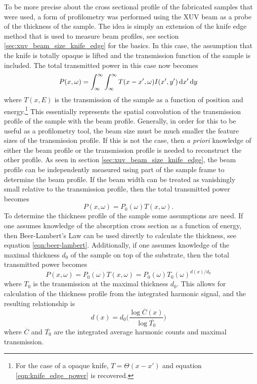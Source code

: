 To be more precise about the cross sectional profile of the fabricated samples that were used, a form of profilometry was performed using the XUV beam as a probe of the thickness of the sample.  The idea is simply an extension of the knife edge method that is used to measure beam profiles, see section \ref{sec:xuv_beam_size_knife_edge} for the basics.  In this case, the assumption that the knife is totally opaque is lifted and the transmission function of the sample is included.  The total transmitted power in this case now becomes
\begin{equation}
	\label{eqn:transmission_knife_edge_power}
	P(x, \omega) = \int_{\infty}^{\infty}\int_{\infty}^{\infty} T(x - x', \omega) I(x', y')\mathop{}\!\mathrm{d} x' \mathop{}\!\mathrm{d} y
\end{equation}
where $T(x, E)$ is the transmission of the sample as a function of position and energy.\footnote{For the case of a opaque knife, $T = \Theta(x - x')$ and equation \ref{eqn:knife_edge_power} is recovered.} This essentially represents the spatial convolution of the transmission profile of the sample with the beam profile.  Generally, in order for this to be useful as a profilometry tool, the beam size must be much smaller the feature sizes of the transmission profile.  If this is not the case, then \emph{a priori} knowledge of either the beam profile or the transmission profile is needed to reconstruct the other profile.  As seen in section \ref{sec:xuv_beam_size_knife_edge}, the beam profile can be independently measured using part of the sample frame to determine the beam profile.  If the beam width can be treated as vanishingly small relative to the transmission profile, then the total transmitted power becomes
\begin{equation}
	\label{eqn:knife_edge_delta}
	P(x,\omega) = P_0(\omega)T(x,\omega).
\end{equation}
To determine the thickness profile of the sample some assumptions are need.  If one assumes knowledge of the absorption cross section as a function of energy, then Beer-Lambert's Law can be used directly to calculate the thickness, see equation \ref{eqn:beer-lambert}.  Additionally, if one assumes knowledge of the maximal thickness $d_0$ of the sample on top of the substrate, then the total transmitted power becomes
\begin{equation}
	\label{eqn:trans_power_thickness_assumed}
	P(x,\omega) = P_0(\omega)T(x,\omega) = P_0(\omega)T_0(\omega)^{d(x)/d_0}
\end{equation} 
where $T_0$ is the transmission at the maximal thickness $d_0$.  This allows for calculation of the thickness profile from the integrated harmonic signal, and the resulting relationship is 
\begin{equation}
	\label{eqn:thickness_calc}
	d(x) = d_0\bigg(\frac{\log \overline{C}(x)}{\log \overline{T_0}}\bigg)
\end{equation}
where $\overline{C}$ and $\overline{T_0}$ are the integrated average harmonic counts and maximal transmission.

